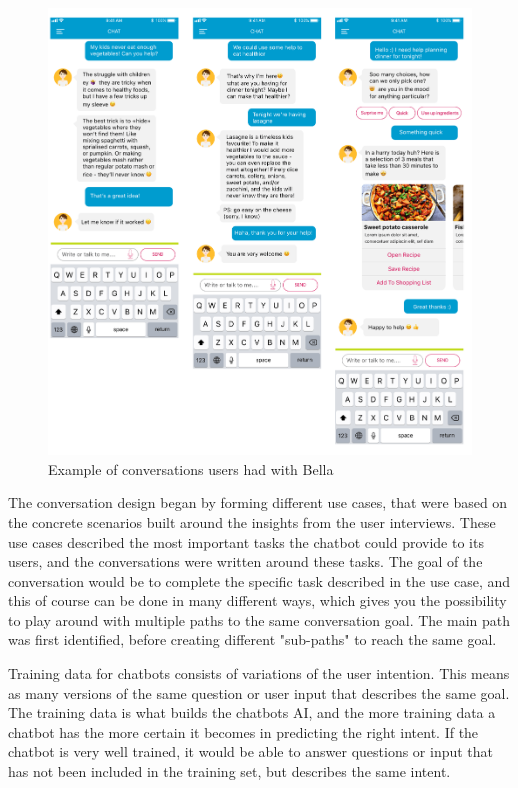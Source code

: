 \begin{figure}[H]
    \centering
    \includegraphics {figures/conversationflow_2.png}
    \caption{Example of conversations users had with Bella}
    \label{fig:convflow}
\end{figure}
    
The conversation design began by forming different use cases, that were based on the concrete scenarios built around the insights from the user interviews. These use cases described the most important tasks the chatbot could provide to its users, and the conversations were written around these tasks. The goal of the conversation would be to complete the specific task described in the use case, and this of course can be done in many different ways, which gives you the possibility to play around with multiple paths to the same conversation goal. The main path was first identified, before creating different "sub-paths" to reach the same goal. 
    
Training data for chatbots consists of variations of the user intention. This means as many versions of the same question or user input that describes the same goal. The training data is what builds the chatbots AI, and the more training data a chatbot has the more certain it becomes in predicting the right intent. If the chatbot is very well trained, it would be able to answer questions or input that has not been included in the training set, but describes the same intent.

